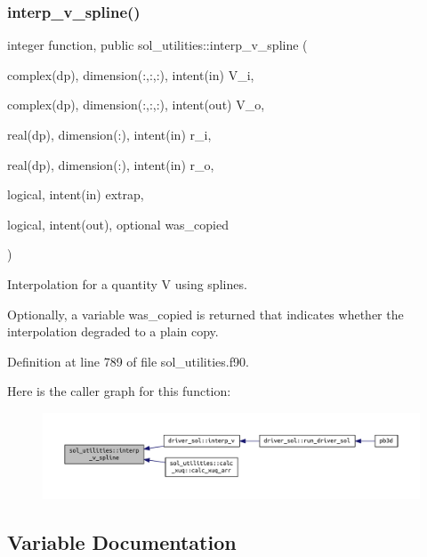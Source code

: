 \subsubsection{\texorpdfstring{interp\+\_\+v\+\_\+spline()}{interp\_v\_spline()}}
{\footnotesize\ttfamily integer function, public sol\+\_\+utilities\+::interp\+\_\+v\+\_\+spline (\begin{DoxyParamCaption}\item[{complex(dp), dimension(\+:,\+:,\+:), intent(in)}]{V\+\_\+i,  }\item[{complex(dp), dimension(\+:,\+:,\+:), intent(out)}]{V\+\_\+o,  }\item[{real(dp), dimension(\+:), intent(in)}]{r\+\_\+i,  }\item[{real(dp), dimension(\+:), intent(in)}]{r\+\_\+o,  }\item[{logical, intent(in)}]{extrap,  }\item[{logical, intent(out), optional}]{was\+\_\+copied }\end{DoxyParamCaption})}



Interpolation for a quantity V using splines. 

Optionally, a variable \textquotesingle{}was\+\_\+copied\textquotesingle{} is returned that indicates whether the interpolation degraded to a plain copy. 

Definition at line 789 of file sol\+\_\+utilities.\+f90.

Here is the caller graph for this function\+:\nopagebreak
\begin{figure}[H]
\begin{center}
\leavevmode
\includegraphics[width=350pt]{namespacesol__utilities_a93969085ad0fce8e530493a412b1ce38_icgraph}
\end{center}
\end{figure}


\subsection{Variable Documentation}
\mbox{\label{namespacesol__utilities_a4779ff845b4ddc046892bf4eb4490dd2}} 
